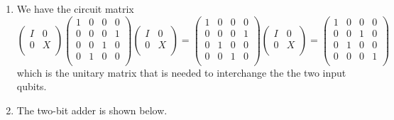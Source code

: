\documentclass [12pt]{article}
\theoremstyle{definition}
\begin{document}
\begin{enumerate}
\item We have the circuit matrix
\[
\left(\begin{array}{cc}
I & 0\\
0 & X\\
\end{array}\right)
\left(\begin{array}{cccc}
1 & 0 & 0 & 0 \\
0 & 0 & 0 & 1 \\
0 & 0 & 1 & 0 \\
0 & 1 & 0 & 0 \\
\end{array}\right)
\left(\begin{array}{cc}
I & 0\\
0 & X\\
\end{array}\right)=
\left(\begin{array}{cccc}
1 & 0 & 0 & 0 \\
0 & 0 & 0 & 1 \\
0 & 1 & 0 & 0 \\
0 & 0 & 1 & 0 \\
\end{array}\right)
\left(\begin{array}{cc}
I & 0\\
0 & X\\
\end{array}\right)=
\left(\begin{array}{cccc}
1 & 0 & 0 & 0 \\
0 & 0 & 1 & 0 \\
0 & 1 & 0 & 0 \\
0 & 0 & 0 & 1 \\
\end{array}\right)
\]
which is the unitary matrix that is needed to interchange the the two input qubits.






\item The two-bit adder is shown below.

\end{enumerate}
\end{document}
